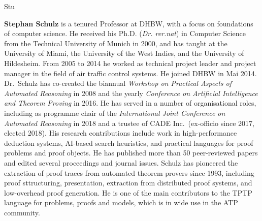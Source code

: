 \begin{sitedescription}{Stu}
\begin{compactitem}
\item \textbf{Stephan Schulz} is a tenured Professor at DHBW, with a
  focus on foundations of computer science. He received his
  Ph.D. (\emph{Dr. rer.nat}) in Computer Science from the Technical
  University of Munich in 2000, and has taught at the University of
  Miami, the University of the West Indies, and the University of
  Hildesheim. From 2005 to 2014 he worked as technical project leader
  and project manager in the field of air traffic control systems. He
  joined DHBW in Mai 2014. Dr.\ Schulz has co-created the biannual
  \emph{Workshop on Practical Aspects of Automated Reasoning} in 2008
  and the yearly \emph{Conference on Artificial Intelligence and
    Theorem Proving} in 2016. He has served in a number of
  organisational roles, including as programme chair of the
  \emph{International Joint Conference on Automated Reasoning} in 2018
  and a trustee of CADE Inc.\ (ex-officio since 2017, elected
  2018). His research contributions include work in high-performance
  deduction systems, AI-based search heuristics, and practical
  languages for proof problems and proof objects. He has published
  more than 50 peer-reviewed papers and edited several proceedings and
  journal issues. Schulz has pioneered the extraction of proof traces
  from automated theorem provers since 1993, including proof
  sttructuring, presentation, extraction from distributed proof
  systems, and low-overhead proof generation. He is one of the main
  contributors to the TPTP language for problems, proofs and models,
  which is in wide use in the ATP community.
\end{compactitem}

\end{sitedescription}

